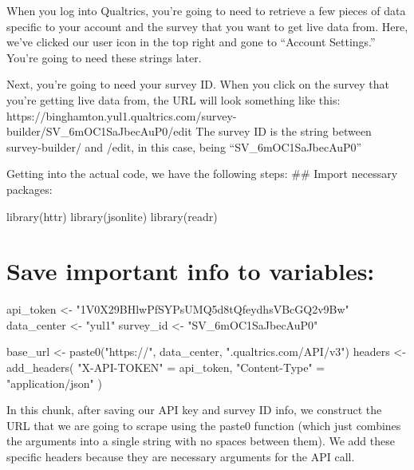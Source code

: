 \documentclass[
  english,
  letterpaper,
  DIV=11,
  numbers=noendperiod]{scrreprt}
\newenvironment{Shaded}{\begin{snugshade}}{\end{snugshade}}
\newcommand{\FunctionTok}[1]{\textcolor[rgb]{0.28,0.35,0.67}{#1}}
\newcommand{\NormalTok}[1]{\textcolor[rgb]{0.00,0.23,0.31}{#1}}
\newcommand{\OtherTok}[1]{\textcolor[rgb]{0.00,0.23,0.31}{#1}}
\newcommand{\StringTok}[1]{\textcolor[rgb]{0.13,0.47,0.30}{#1}}
\begin{document}
When you log into Qualtrics, you're going to need to retrieve a few
pieces of data specific to your account and the survey that you want to
get live data from. Here, we've clicked our user icon in the top right
and gone to ``Account Settings.'' You're going to need these strings
later.

Next, you're going to need your survey ID. When you click on the survey
that you're getting live data from, the URL will look something like
this:
https://binghamton.yul1.qualtrics.com/survey-builder/SV\_6mOC1SaJbecAuP0/edit
The survey ID is the string between survey-builder/ and /edit, in this
case, being ``SV\_6mOC1SaJbecAuP0''

Getting into the actual code, we have the following steps: \#\# Import
necessary packages:

\begin{Shaded}
\begin{Highlighting}[]
\FunctionTok{library}\NormalTok{(httr)}
\FunctionTok{library}\NormalTok{(jsonlite)}
\FunctionTok{library}\NormalTok{(readr)}
\end{Highlighting}
\end{Shaded}

\section{Save important info to
variables:}\label{save-important-info-to-variables}

\begin{Shaded}
\begin{Highlighting}[]
\NormalTok{api\_token }\OtherTok{\textless{}{-}} \StringTok{"1V0X29BHlwPfSYPsUMQ5d8tQfeydhsVBcGQ2v9Bw"}
\NormalTok{data\_center }\OtherTok{\textless{}{-}} \StringTok{"yul1"}
\NormalTok{survey\_id }\OtherTok{\textless{}{-}} \StringTok{"SV\_6mOC1SaJbecAuP0"}

\NormalTok{base\_url }\OtherTok{\textless{}{-}} \FunctionTok{paste0}\NormalTok{(}\StringTok{"https://"}\NormalTok{, data\_center, }\StringTok{".qualtrics.com/API/v3"}\NormalTok{)}
\NormalTok{headers }\OtherTok{\textless{}{-}} \FunctionTok{add\_headers}\NormalTok{(}
  \StringTok{"X{-}API{-}TOKEN"} \OtherTok{=}\NormalTok{ api\_token,}
  \StringTok{"Content{-}Type"} \OtherTok{=} \StringTok{"application/json"}
\NormalTok{)}
\end{Highlighting}
\end{Shaded}

In this chunk, after saving our API key and survey ID info, we construct
the URL that we are going to scrape using the paste0 function (which
just combines the arguments into a single string with no spaces between
them). We add these specific headers because they are necessary
arguments for the API call.
\end{document}
